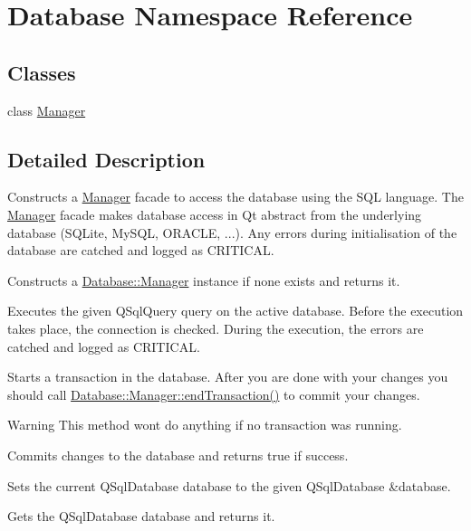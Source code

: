 \hypertarget{namespaceDatabase}{}\section{Database Namespace Reference}
\label{namespaceDatabase}
\subsection*{Classes}
\begin{DoxyCompactItemize}
\item 
class \mbox{\hyperlink{classDatabase_1_1Manager}{Manager}}
\end{DoxyCompactItemize}


\subsection{Detailed Description}
Constructs a \mbox{\hyperlink{classDatabase_1_1Manager}{Manager}} facade to access the database using the S\+QL language. The \mbox{\hyperlink{classDatabase_1_1Manager}{Manager}} facade makes database access in Qt abstract from the underlying database (S\+Q\+Lite, My\+S\+QL, O\+R\+A\+C\+LE, ...). Any errors during initialisation of the database are catched and logged as C\+R\+I\+T\+I\+C\+AL.

Constructs a \mbox{\hyperlink{classDatabase_1_1Manager}{Database\+::\+Manager}} instance if none exists and returns it.

Executes the given Q\+Sql\+Query query on the active database. Before the execution takes place, the connection is checked. During the execution, the errors are catched and logged as C\+R\+I\+T\+I\+C\+AL.

Starts a transaction in the database. After you are done with your changes you should call \mbox{\hyperlink{classDatabase_1_1Manager_a08dc190a448c555f8334bdd60d32b26e}{Database\+::\+Manager\+::end\+Transaction()}} to commit your changes.

\begin{DoxyWarning}{Warning}
This method won\textquotesingle{}t do anything if no transaction was running.
\end{DoxyWarning}
Commits changes to the database and returns true if success.

Sets the current Q\+Sql\+Database database to the given Q\+Sql\+Database \&database.

Gets the Q\+Sql\+Database database and returns it. 